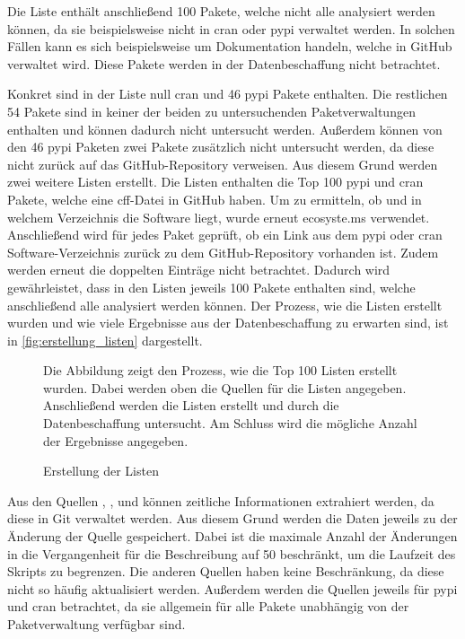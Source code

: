 Die Liste enthält anschließend 100 Pakete, welche nicht alle analysiert werden können, da sie beispielsweise nicht in \gls{cran} oder \gls{pypi} verwaltet werden.
In solchen Fällen kann es sich beispielsweise um Dokumentation handeln, welche in GitHub verwaltet wird.
Diese Pakete werden in der Datenbeschaffung nicht betrachtet.

Konkret sind in der Liste null \gls{cran} und 46 \gls{pypi} Pakete enthalten.
Die restlichen 54 Pakete sind in keiner der beiden zu untersuchenden Paketverwaltungen enthalten und können dadurch nicht untersucht werden.
Außerdem können von den 46 \gls{pypi} Paketen zwei Pakete zusätzlich nicht untersucht werden, da diese nicht zurück auf das GitHub-Repository verweisen.
Aus diesem Grund werden zwei weitere Listen erstellt.
Die Listen enthalten die Top 100 \gls{pypi} und \gls{cran} Pakete, welche eine \gls{cff}-Datei in GitHub haben.
Um zu ermitteln, ob und in welchem Verzeichnis die Software liegt, wurde erneut ecosyste.ms verwendet.
Anschließend wird für jedes Paket geprüft, ob ein Link aus dem \gls{pypi} oder \gls{cran} Software-Verzeichnis zurück zu dem GitHub-Repository vorhanden ist.
Zudem werden erneut die doppelten Einträge nicht betrachtet.
Dadurch wird gewährleistet, dass in den Listen jeweils 100 Pakete enthalten sind, welche anschließend alle analysiert werden können.
Der Prozess, wie die Listen erstellt wurden und wie viele Ergebnisse aus der Datenbeschaffung zu erwarten sind, ist in \autoref{fig:erstellung_listen} dargestellt.

\begin{figure}
    \begin{center}
        
    \end{center}
    \caption{Erstellung der Listen}
    \label{fig:erstellung_listen}
    \small
    Die Abbildung zeigt den Prozess, wie die Top 100 Listen erstellt wurden. Dabei werden oben die Quellen für die Listen angegeben. Anschließend werden die Listen erstellt und durch die Datenbeschaffung untersucht. Am Schluss wird die mögliche Anzahl der Ergebnisse angegeben.
\end{figure}

Aus den Quellen , ,  und  können zeitliche Informationen extrahiert werden, da diese in Git verwaltet werden.
Aus diesem Grund werden die Daten jeweils zu der Änderung der Quelle gespeichert.
Dabei ist die maximale Anzahl der Änderungen in die Vergangenheit für die Beschreibung auf 50 beschränkt, um die Laufzeit des Skripts zu begrenzen.
Die anderen Quellen haben keine Beschränkung, da diese nicht so häufig aktualisiert werden.
Außerdem werden die Quellen jeweils für \gls{pypi} und \gls{cran} betrachtet, da sie allgemein für alle Pakete unabhängig von der Paketverwaltung verfügbar sind.

